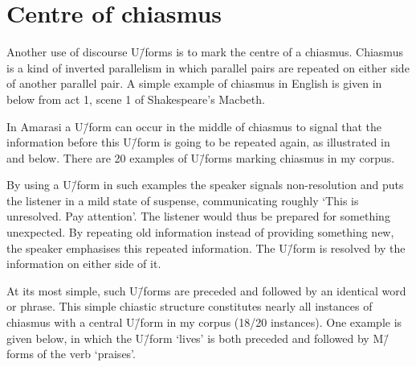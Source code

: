 \section{Centre of chiasmus}\label{sec:CenChi}
Another use of discourse U\=/forms is to mark the centre of a chiasmus.
Chiasmus is a kind of inverted parallelism in which parallel pairs
are repeated on either side of another parallel pair.
A simple example of chiasmus in English is given in 
below from act 1, scene 1 of Shakespeare's Macbeth.

\begin{exe}
	\label{ex:Macbeth}
\end{exe}

In Amarasi a U\=/form can occur in the middle of chiasmus to signal
that the information before this U\=/form
is going to be repeated again, as illustrated in  and  below.
There are 20 examples of U\=/forms marking chiasmus in my corpus.

\begin{exe}
	\label{ex:ChiUfor}
		\begin{xlist}
		\end{xlist}
\end{exe}

\begin{exe}
	\label{ex:ChiUfor2}
\end{exe}

By using a U\=/form in such examples the speaker
signals non-resolution and puts the listener
in a mild state of suspense, communicating
roughly `This is unresolved. Pay attention'.
The listener would thus be prepared for something unexpected.
By repeating old information
instead of providing something new,
the speaker emphasises this repeated information.
The U\=/form is resolved by the information on either side of it.

At its most simple, such U\=/forms are preceded and followed
by an identical word or phrase.
This simple chiastic structure constitutes nearly all
instances of chiasmus with a central U\=/form in my corpus (18/20 instances).
One example is given  below,
in which the U\=/form  `lives' is both preceded and followed
by M\=/forms of the verb  `praises'.

